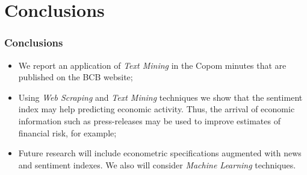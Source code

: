 \documentclass[aspectratio=169]{beamer}
\begin{document}

\section{Conclusions}

\begin{frame}\frametitle{Conclusions}
  \begin{itemize}
    \item We report an application of \emph{Text Mining} in the Copom minutes that are published on the BCB website;
    \item Using \emph{Web Scraping} and \emph{Text Mining} techniques we show that the sentiment index may help predicting economic activity. Thus, the arrival of economic information such as press-releases may be used to improve estimates of financial risk, for example;
\item Future research will include econometric specifications augmented with news and sentiment indexes. We also will consider \emph{Machine Learning} techniques. 
  \end{itemize}
\end{frame}
\end{document}
